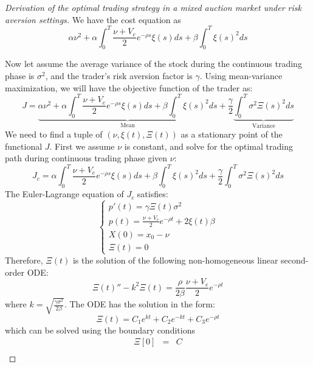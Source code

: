 
\begin{proof}[Derivation of the optimal trading strategy in a mixed auction market under risk aversion settings]\label{proof:optimal-strategy-mixed-auction-risk-aversion}
  We have the cost equation as
  \[
    \alpha \nu^2 + \alpha \int_0^T \frac{\nu + V_e}{2} e^{- \rho s} \xi(s) ds + \beta \int_0^T \xi(s)^2 ds
  \]

  Now let assume the average variance of the stock during the continuous trading phase is $\sigma^2$, and the trader's risk aversion factor is $\gamma$. Using mean-variance maximization, we will have the objective function of the trader as:
  \[
    J = \underbrace{\alpha \nu^2 + \alpha \int_0^T \frac{\nu + V_e}{2} e^{- \rho s} \xi(s) ds + \beta \int_0^T \xi(s)^2 ds}_{\text{Mean}} + \frac{\gamma}{2} \underbrace{\int_0^T \sigma^2 \Xi(s)^2 ds}_{\text{Variance}}
  \]
  We need to find a tuple of $(\nu, \xi(t), \Xi(t))$ as a stationary point of the functional $J$. First we assume $\nu$ is constant, and solve for the optimal trading path during continuous trading phase given $\nu$:
  \[
    J_c = \alpha \int_0^T \frac{\nu + V_e}{2} e^{- \rho s} \xi(s) ds + \beta \int_0^T \xi(s)^2 ds + \frac{\gamma}{2} \int_0^T \sigma^2 \Xi(s)^2 ds
  \]
  The Euler-Lagrange equation of $J_c$ satisfies:
  \begin{equation}
    \begin{cases}
      p'(t) =  \gamma \Xi(t) \sigma^2                          \\
      p(t) = \frac{\nu + V_e}{2} e^{- \rho t} + 2 \xi(t) \beta \\
      X(0) = x_0-\nu                                           \\
      \Xi(t) = 0
    \end{cases}
  \end{equation}
  Therefore, $\Xi(t)$ is the solution of the following non-homogeneous linear second-order ODE:
  \begin{equation}\label{eqn:cont_obj_func}
    \Xi(t)'' - k^2 \Xi(t) = \frac{\rho}{2\beta} \frac{\nu + V_e}{2} e^{- \rho t}
  \end{equation}
  where $k=\sqrt{\frac{\gamma \sigma^2}{2\beta}}$. The ODE has the solution in the form:
  \begin{equation}\label{eqn:sln_form}
    \Xi(t) = C_1 e^{k t} + C_2 e^{-k t} + C_3 e^{-\rho t}
  \end{equation}
  which can be solved using the boundary conditions
  \begin{eqnarray}
    \Xi[0] &=& C\\

\end{eqnarray}
\end{proof}
